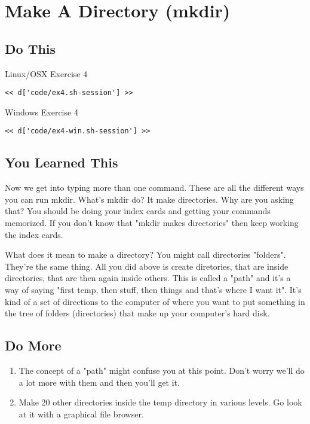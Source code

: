 \chapter{Make A Directory (mkdir)}

\section{Do This}

\begin{code}{Linux/OSX Exercise 4}
\begin{Verbatim}
<< d['code/ex4.sh-session'] >>
\end{Verbatim}
\end{code}

\begin{code}{Windows Exercise 4}
\begin{Verbatim}
<< d['code/ex4-win.sh-session'] >>
\end{Verbatim}
\end{code}

\section{You Learned This}

Now we get into typing more than one command.  These are all the different ways
you can run mkdir.  What's mkdir do?  It make directories.  Why are you asking
that?  You should be doing your index cards and getting your commands memorized.
If you don't know that "mkdir makes directories" then keep working the index
cards.

What does it mean to make a directory?  You might call directories "folders".  They're
the same thing.  All you did above is create diretories, that are inside directories,
that are then again inside others.  This is called a "path" and it's a way of saying
"first temp, then stuff, then things and that's where I want it".  It's kind of a
set of directions to the computer of where you want to put something in the tree
of folders (directories) that make up your computer's hard disk.

\section{Do More}

\begin{enumerate}
\item The concept of a "path" might confuse you at this point.  Don't worry we'll 
    do a lot more with them and then you'll get it.
\item Make 20 other directories inside the temp directory in various levels.  Go look at it
    with a graphical file browser.
\end{enumerate}


